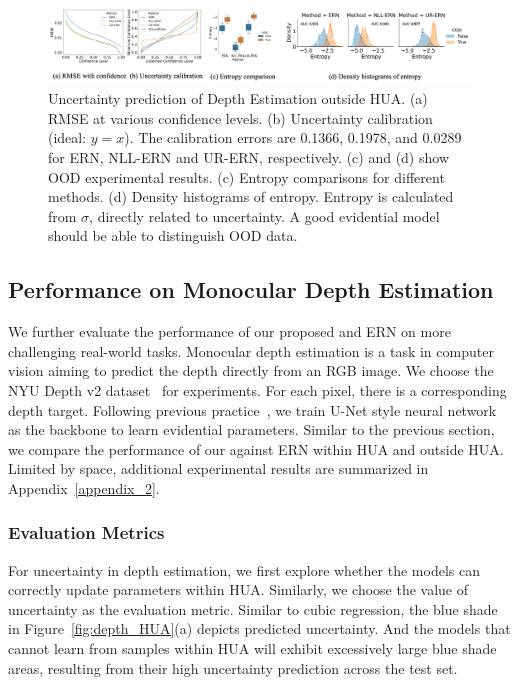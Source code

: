 \begin{figure}[t!]
  \centering
  \includegraphics[width=0.95\linewidth]{depth_outside_HUA.jpg} 
  \caption{Uncertainty prediction of Depth Estimation outside HUA. (a) RMSE at various confidence levels. (b) Uncertainty calibration (ideal: $y=x$). The calibration errors are 0.1366, 0.1978, and 0.0289 for ERN, NLL-ERN and UR-ERN, respectively. (c) and (d) show OOD experimental results. (c) Entropy comparisons for different methods. (d) Density histograms of entropy. Entropy is calculated from $\sigma$, directly related to uncertainty. A good evidential model should be able to distinguish OOD data.}
  \label{fig:depth_outside_HUA}
\end{figure}



\subsection{Performance on Monocular Depth Estimation}


We further evaluate the performance of our proposed \ours and ERN on more challenging real-world tasks. Monocular depth estimation is a task in computer vision aiming to predict the depth directly from an RGB image. We choose the NYU Depth v2 dataset~\cite{silberman2012indoor} for experiments.
For each pixel, there is a corresponding depth target. Following previous practice~\cite{NEURIPS2020_aab08546}, we train U-Net \cite{ronneberger2015u} style neural network as the backbone to learn evidential parameters. Similar to the previous section, we compare the performance of our \ours against ERN within HUA and outside HUA. Limited by space, additional experimental results are summarized in Appendix~\ref{appendix_2}.

\subsubsection{Evaluation Metrics}
For uncertainty in depth estimation, we first explore whether the models can correctly update parameters within HUA. Similarly, we choose the value of uncertainty as the evaluation metric. Similar to cubic regression, the blue shade in Figure~\ref{fig:depth_HUA}(a) depicts  predicted uncertainty. 
And the models that cannot learn from samples within HUA will exhibit excessively large blue shade areas, resulting from their high uncertainty prediction across the test set. 

